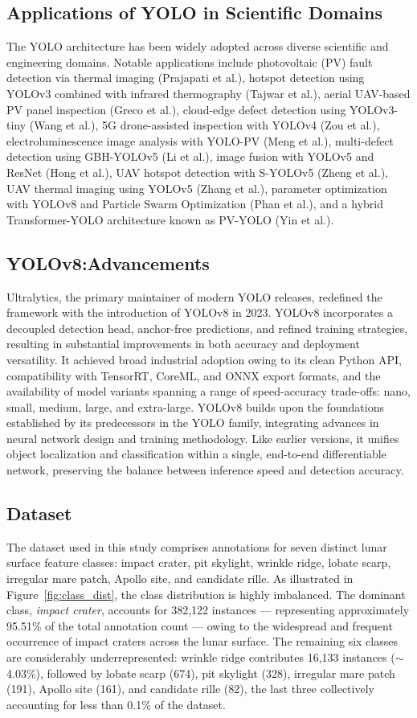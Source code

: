 \documentclass{aa}
\begin{document}
\subsection{Applications of YOLO in Scientific Domains}
The YOLO architecture has been widely adopted across diverse scientific and engineering domains. Notable applications include photovoltaic (PV) fault detection via thermal imaging (Prajapati et al.), hotspot detection using YOLOv3 combined with infrared thermography (Tajwar et al.), aerial UAV-based PV panel inspection (Greco et al.), cloud-edge defect detection using YOLOv3-tiny (Wang et al.), 5G drone-assisted inspection with YOLOv4 (Zou et al.), electroluminescence image analysis with YOLO-PV (Meng et al.), multi-defect detection using GBH-YOLOv5 (Li et al.), image fusion with YOLOv5 and ResNet (Hong et al.), UAV hotspot detection with S-YOLOv5 (Zheng et al.), UAV thermal imaging using YOLOv5 (Zhang et al.), parameter optimization with YOLOv8 and Particle Swarm Optimization (Phan et al.), and a hybrid Transformer-YOLO architecture known as PV-YOLO (Yin et al.).
\subsection{YOLOv8:Advancements}
Ultralytics, the primary maintainer of modern YOLO releases, redefined the framework with the introduction of YOLOv8 in 2023. YOLOv8 incorporates a decoupled detection head, anchor-free predictions, and refined training strategies, resulting in substantial improvements in both accuracy and deployment versatility. It achieved broad industrial adoption owing to its clean Python API, compatibility with TensorRT, CoreML, and ONNX export formats, and the availability of model variants spanning a range of speed-accuracy trade-offs: nano, small, medium, large, and extra-large.
YOLOv8 builds upon the foundations established by its predecessors in the YOLO family, integrating advances in neural network design and training methodology. Like earlier versions, it unifies object localization and classification within a single, end-to-end differentiable network, preserving the balance between inference speed and detection accuracy. 
\subsection{Dataset}

The dataset used in this study comprises annotations for seven distinct lunar surface 
feature classes: impact crater, pit skylight, wrinkle ridge, lobate scarp, irregular 
mare patch, Apollo site, and candidate rille. As illustrated in Figure~\ref{fig:class_dist}, 
the class distribution is highly imbalanced. The dominant class, \textit{impact crater}, 
accounts for 382,122 instances — representing approximately 95.51\% of the total annotation 
count — owing to the widespread and frequent occurrence of impact craters across the lunar 
surface. The remaining six classes are considerably underrepresented: wrinkle ridge 
contributes 16,133 instances ($\sim$4.03\%), followed by lobate scarp (674), pit skylight 
(328), irregular mare patch (191), Apollo site (161), and candidate rille (82), the last 
three collectively accounting for less than 0.1\% of the dataset.
\end{document}
